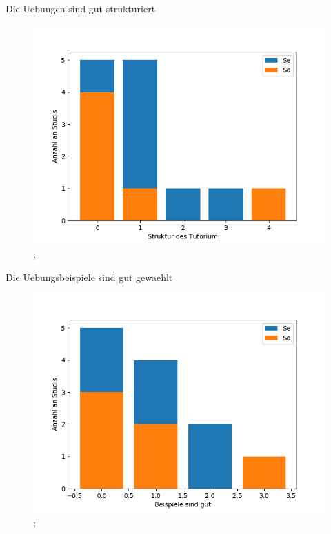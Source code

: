 \documentclass[10pt]{beamer}
\begin{document}
\begin{frame}[fragile]{Die Uebungen sind gut strukturiert} 
 \begin{figure}
 \includegraphics[width= 0.9\linewidth]{./PDFcreater/Plots/Nx/Die+Uebungen+sind+gut+strukturiert.png};
 \end{figure}
 \end{frame}
\begin{frame}[fragile]{Die Uebungsbeispiele sind gut gewaehlt} 
 \begin{figure}
 \includegraphics[width= 0.9\linewidth]{./PDFcreater/Plots/Nx/Die+Uebungsbeispiele+sind+gut+gewaehlt.png};
 \end{figure}
 \end{frame}
\end{document}

